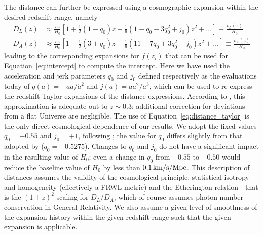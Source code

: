 The distance can further be expressed using a cosmographic expansion within the desired redshift range, namely
\begin{subequations} \label{eq:distance_taylor}
\begin{align}
    D_L(z) & \approx \frac{cz}{H_0} \left[1+\frac{1}{2}(1-q_0) z - \frac{1}{6}(1-q_0 - 3 q_0^2 + j_0) z^2 + \ldots \right] \equiv \frac{v_L(z)}{H_0} \\ 
    D_A(z) & \approx \frac{cz}{H_0} \left[1-\frac{1}{2}(3+q_0) z + \frac{1}{6}(11+7 q_0 + 3 q_0^2 - j_0) z^2 + \ldots \right] \equiv \frac{v_A(z)}{H_0}
\end{align}
\end{subequations}
leading to the corresponding expansions for $f(z_i)$ that can be used for Equation~\ref{eq:intercept} to compute the intercept.
Here we have used the acceleration and jerk parameters $q_0$ and $j_0$ defined respectively as the evaluations today of $q(a)=-\ddot{a}a/\dot{a}^2$ and $j(a) = \dddot{a}a^2/\dot{a}^3$, which can be used to re-express the redshift Taylor expansions of the distance expressions.
According to \citet{2019MNRAS.490.2948D}, this approximation is adequate out to $ z \sim 0.3 $; additional correction for deviations from a flat Universe are negligible.  The use of Equation~\ref{eq:distance_taylor} is the only direct cosmological dependence of our results.  We adopt the fixed values $ q_0 = -0.55 $ and $ j_0 = +1 $, following \citet{2016ApJ...826...56R}; the value for $ q_0 $ differs slightly from that adopted by \citet{2024MNRAS.531...84B} ($q_0 = -0.5275 $).  Changes to $ q_0 $ and $ j_0 $ do not have a significant impact in the resulting value of $ H_0 $; even a change in $ q_0 $ from $ -0.55 $ to $ -0.50 $ would reduce the baseline value of $ H_0 $ by less than $ 0.1 \, \rm km/s/Mpc $.  This description of distances assumes the validity of the cosmological principle, statistical isotropy and homogeneity (effectively a FRWL metric) and the Etherington relation---that is the $(1+z)^2$ scaling for $D_L/D_A$, which of course assumes photon number conservation in General Relativity. We also assume a given level of smoothness of the expansion history within the given redshift range such that the given expansion is applicable.


